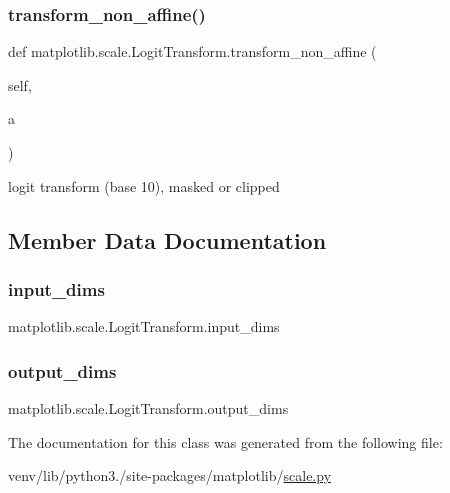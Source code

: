 \subsubsection{\texorpdfstring{transform\+\_\+non\+\_\+affine()}{transform\_non\_affine()}}
{\footnotesize\ttfamily def matplotlib.\+scale.\+Logit\+Transform.\+transform\+\_\+non\+\_\+affine (\begin{DoxyParamCaption}\item[{}]{self,  }\item[{}]{a }\end{DoxyParamCaption})}

\begin{DoxyVerb}logit transform (base 10), masked or clipped\end{DoxyVerb}
 

\subsection{Member Data Documentation}
\mbox{\label{classmatplotlib_1_1scale_1_1LogitTransform_a26ed953c70a6069ba92d1e6a8338a286}} 
\subsubsection{\texorpdfstring{input\+\_\+dims}{input\_dims}}
{\footnotesize\ttfamily matplotlib.\+scale.\+Logit\+Transform.\+input\+\_\+dims\hspace{0.3cm}{\ttfamily [static]}}

\mbox{\label{classmatplotlib_1_1scale_1_1LogitTransform_acfa590216baad79afa2772441a100c55}} 
\subsubsection{\texorpdfstring{output\+\_\+dims}{output\_dims}}
{\footnotesize\ttfamily matplotlib.\+scale.\+Logit\+Transform.\+output\+\_\+dims\hspace{0.3cm}{\ttfamily [static]}}



The documentation for this class was generated from the following file\+:\begin{DoxyCompactItemize}
\item 
venv/lib/python3./site-\/packages/matplotlib/\hyperlink{scale_8py}{scale.\+py}\end{DoxyCompactItemize}
